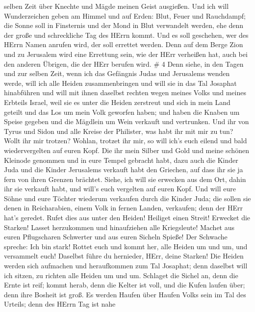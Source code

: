 selben Zeit über Knechte und Mägde meinen Geist ausgießen. 
Und ich will Wunderzeichen geben am Himmel und auf Erden: Blut, Feuer
und Rauchdampf;  die Sonne soll in Finsternis und der Mond
in Blut verwandelt werden, ehe denn der große und schreckliche Tag des
HErrn kommt.  Und es soll geschehen, wer des HErrn Namen
anrufen wird, der soll errettet werden. Denn auf dem Berge Zion und zu
Jerusalem wird eine Errettung sein, wie der HErr verheißen hat, auch bei
den anderen Übrigen, die der HErr berufen wird. \# 4  Denn
siehe, in den Tagen und zur selben Zeit, wenn ich das Gefängnis Judas
und Jerusalems wenden werde,  will ich alle Heiden
zusammenbringen und will sie in das Tal Josaphat hinabführen und will
mit ihnen daselbst rechten wegen meines Volks und meines Erbteils
Israel, weil sie es unter die Heiden zerstreut und sich in mein Land
geteilt  und das Los um mein Volk geworfen haben; und haben
die Knaben um Speise gegeben und die Mägdlein um Wein verkauft und
vertrunken.  Und ihr von Tyrus und Sidon und alle Kreise der
Philister, was habt ihr mit mir zu tun? Wollt ihr mir trotzen? Wohlan,
trotzet ihr mir, so will ich's euch eilend und bald wiedervergelten auf
euren Kopf.  Die ihr mein Silber und Gold und meine schönen
Kleinode genommen und in eure Tempel gebracht habt,  dazu
auch die Kinder Juda und die Kinder Jerusalems verkauft habt den
Griechen, auf dass ihr sie ja fern von ihren Grenzen brächtet.
 Siehe, ich will sie erwecken aus dem Ort, dahin ihr sie
verkauft habt, und will's euch vergelten auf euren Kopf. 
Und will eure Söhne und eure Töchter wiederum verkaufen durch die Kinder
Juda; die sollen sie denen in Reicharabien, einem Volk in fernen Landen,
verkaufen; denn der HErr hat's geredet.  Rufet dies aus
unter den Heiden! Heiliget einen Streit! Erwecket die Starken! Lasset
herzukommen und hinaufziehen alle Kriegsleute!  Machet aus
euren Pflugscharen Schwerter und aus euren Sicheln Spieße! Der Schwache
spreche: Ich bin stark!  Rottet euch und kommt her, alle
Heiden um und um, und versammelt euch! Daselbst führe du hernieder,
HErr, deine Starken!  Die Heiden werden sich aufmachen und
heraufkommen zum Tal Josaphat; denn daselbst will ich sitzen, zu richten
alle Heiden um und um.  Schlaget die Sichel an, denn die
Ernte ist reif; kommt herab, denn die Kelter ist voll, und die Kufen
laufen über; denn ihre Bosheit ist groß.  Es werden Haufen
über Haufen Volks sein im Tal des Urteils; denn des HErrn Tag ist nahe
